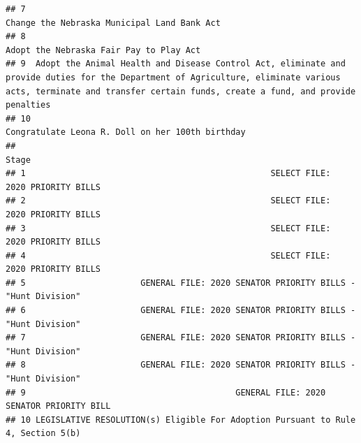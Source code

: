 \documentclass[]{book}
\begin{document}
\begin{verbatim}
## 7                                                                                                                                                                          Change the Nebraska Municipal Land Bank Act
## 8                                                                                                                                                                              Adopt the Nebraska Fair Pay to Play Act
## 9  Adopt the Animal Health and Disease Control Act, eliminate and provide duties for the Department of Agriculture, eliminate various acts, terminate and transfer certain funds, create a fund, and provide penalties
## 10                                                                                                                                                                    Congratulate Leona R. Doll on her 100th birthday
##                                                                               Stage
## 1                                                 SELECT FILE:  2020 PRIORITY BILLS
## 2                                                 SELECT FILE:  2020 PRIORITY BILLS
## 3                                                 SELECT FILE:  2020 PRIORITY BILLS
## 4                                                 SELECT FILE:  2020 PRIORITY BILLS
## 5                       GENERAL FILE: 2020 SENATOR PRIORITY BILLS - "Hunt Division"
## 6                       GENERAL FILE: 2020 SENATOR PRIORITY BILLS - "Hunt Division"
## 7                       GENERAL FILE: 2020 SENATOR PRIORITY BILLS - "Hunt Division"
## 8                       GENERAL FILE: 2020 SENATOR PRIORITY BILLS - "Hunt Division"
## 9                                          GENERAL FILE: 2020 SENATOR PRIORITY BILL
## 10 LEGISLATIVE RESOLUTION(s) Eligible For Adoption Pursuant to Rule 4, Section 5(b)
\end{verbatim}
\end{document}
